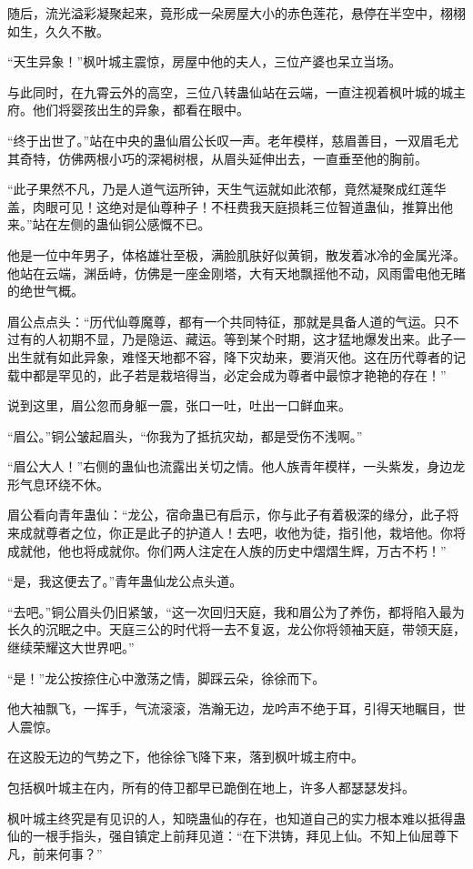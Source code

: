 \begin{this_body}
随后，流光溢彩凝聚起来，竟形成一朵房屋大小的赤色莲花，悬停在半空中，栩栩如生，久久不散。

“天生异象！”枫叶城主震惊，房屋中他的夫人，三位产婆也呆立当场。

与此同时，在九霄云外的高空，三位八转蛊仙站在云端，一直注视着枫叶城的城主府。他们将婴孩出生的异象，都看在眼中。

“终于出世了。”站在中央的蛊仙眉公长叹一声。老年模样，慈眉善目，一双眉毛尤其奇特，仿佛两根小巧的深褐树根，从眉头延伸出去，一直垂至他的胸前。

“此子果然不凡，乃是人道气运所钟，天生气运就如此浓郁，竟然凝聚成红莲华盖，肉眼可见！这绝对是仙尊种子！不枉费我天庭损耗三位智道蛊仙，推算出他来。”站在左侧的蛊仙铜公感慨不已。

他是一位中年男子，体格雄壮至极，满脸肌肤好似黄铜，散发着冰冷的金属光泽。他站在云端，渊岳峙，仿佛是一座金刚塔，大有天地飘摇他不动，风雨雷电他无睹的绝世气概。

眉公点点头：“历代仙尊魔尊，都有一个共同特征，那就是具备人道的气运。只不过有的人初期不显，乃是隐运、藏运。等到某个时期，这才猛地爆发出来。此子一出生就有如此异象，难怪天地都不容，降下灾劫来，要消灭他。这在历代尊者的记载中都是罕见的，此子若是栽培得当，必定会成为尊者中最惊才艳艳的存在！”

说到这里，眉公忽而身躯一震，张口一吐，吐出一口鲜血来。

“眉公。”铜公皱起眉头，“你我为了抵抗灾劫，都是受伤不浅啊。”

“眉公大人！”右侧的蛊仙也流露出关切之情。他人族青年模样，一头紫发，身边龙形气息环绕不休。

眉公看向青年蛊仙：“龙公，宿命蛊已有启示，你与此子有着极深的缘分，此子将来成就尊者之位，你正是此子的护道人！去吧，收他为徒，指引他，栽培他。你将成就他，他也将成就你。你们两人注定在人族的历史中熠熠生辉，万古不朽！”

“是，我这便去了。”青年蛊仙龙公点头道。

“去吧。”铜公眉头仍旧紧皱，“这一次回归天庭，我和眉公为了养伤，都将陷入最为长久的沉眠之中。天庭三公的时代将一去不复返，龙公你将领袖天庭，带领天庭，继续荣耀这大世界吧。”

“是！”龙公按捺住心中激荡之情，脚踩云朵，徐徐而下。

他大袖飘飞，一挥手，气流滚滚，浩瀚无边，龙吟声不绝于耳，引得天地瞩目，世人震惊。

在这股无边的气势之下，他徐徐飞降下来，落到枫叶城主府中。

包括枫叶城主在内，所有的侍卫都早已跪倒在地上，许多人都瑟瑟发抖。

枫叶城主终究是有见识的人，知晓蛊仙的存在，也知道自己的实力根本难以抵得蛊仙的一根手指头，强自镇定上前拜见道：“在下洪铸，拜见上仙。不知上仙屈尊下凡，前来何事？”


\end{this_body}

